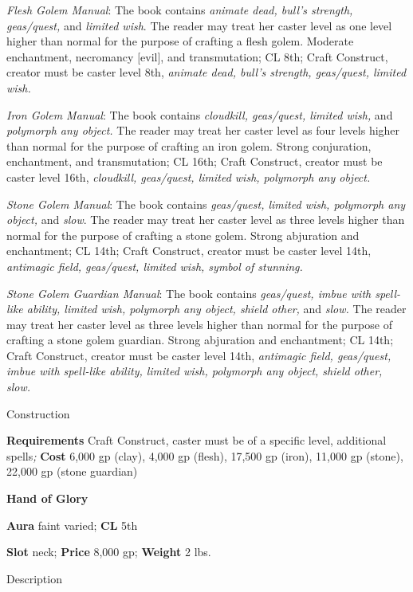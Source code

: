 \textit{Flesh Golem Manual}: The book contains \textit{animate dead, bull's strength, geas/quest,} and \textit{limited wish}. The reader may treat her caster level as one level higher than normal for the purpose of crafting a flesh golem. Moderate enchantment, necromancy \mbox{$[$}evil\mbox{$]$}, and transmutation; CL 8th; Craft Construct, creator must be caster level 8th,\textit{ animate dead, bull's strength, geas/quest, limited wish.}
				
\textit{Iron Golem Manual}: The book contains \textit{cloudkill, geas/quest, limited wish,} and \textit{polymorph any object.} The reader may treat her caster level as four levels higher than normal for the purpose of crafting an iron golem. Strong conjuration, enchantment, and transmutation; CL 16th; Craft Construct, creator must be caster level 16th,\textit{ cloudkill, geas/quest, limited wish, polymorph any object.}
				
\textit{Stone Golem Manual}: The book contains \textit{geas/quest, limited wish, polymorph any object,} and \textit{slow}. The reader may treat her caster level as three levels higher than normal for the purpose of crafting a stone golem. Strong abjuration and enchantment; CL 14th; Craft Construct, creator must be caster level 14th,\textit{ antimagic field, geas/quest, limited wish, symbol of stunning.}
				
\textit{Stone Golem Guardian Manual}: The book contains\textit{ geas/quest, imbue with spell-like ability, limited wish, polymorph any object, shield other, }and\textit{ slow. }The reader may treat her caster level as three levels higher than normal for the purpose of crafting a stone golem guardian. Strong abjuration and enchantment; CL 14th; Craft Construct, creator must be caster level 14th,\textit{ antimagic field, geas/quest, imbue with spell-like ability, limited wish, polymorph any object, shield other, slow.}
				
Construction
				
\textbf{Requirements} Craft Construct, caster must be of a specific level, additional spells\textit{; }\textbf{Cost }6,000 gp (clay), 4,000 gp (flesh), 17,500 gp (iron), 11,000 gp (stone), 22,000 gp (stone guardian)
				
\textbf{Hand of Glory}
				
\textbf{Aura} faint varied;\textbf{ CL }5th
				
\textbf{Slot} neck; \textbf{Price} 8,000 gp; \textbf{Weight} 2 lbs.
				
Description
				
